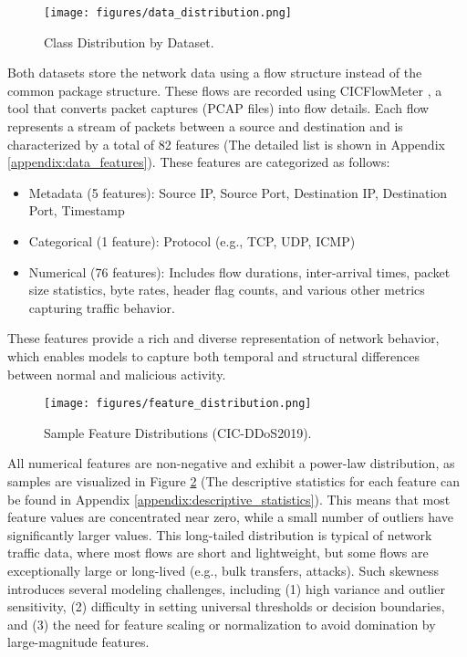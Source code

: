 \begin{figure}[h]
    \centering
    \texttt{[image: figures/data\_distribution.png]}
    \caption{Class Distribution by Dataset.}
    \label{fig:data_distribution}
\end{figure}

Both datasets store the network data using a flow structure instead of the common package structure. These flows are recorded using CICFlowMeter \citep{cicflowmeter}, a tool that converts packet captures (PCAP files) into flow details. Each flow represents a stream of packets between a source and destination and is characterized by a total of 82 features (The detailed list is shown in Appendix \ref{appendix:data_features}). These features are categorized as follows:

\begin{itemize}
    \item Metadata (5 features): Source IP, Source Port, Destination IP, Destination Port, Timestamp
    \item Categorical (1 feature): Protocol (e.g., TCP, UDP, ICMP)
    \item Numerical (76 features): Includes flow durations, inter-arrival times, packet size statistics, byte rates, header flag counts, and various other metrics capturing traffic behavior.
\end{itemize}

These features provide a rich and diverse representation of network behavior, which enables models to capture both temporal and structural differences between normal and malicious activity.

\begin{figure}[h]
    \centering
    \texttt{[image: figures/feature\_distribution.png]}
    \caption{Sample Feature Distributions (CIC-DDoS2019).}
    \label{fig:feature_distribution}
\end{figure}

All numerical features are non-negative and exhibit a power-law distribution, as samples are visualized in Figure \ref{fig:feature_distribution} (The descriptive statistics for each feature can be found in Appendix \ref{appendix:descriptive_statistics}). This means that most feature values are concentrated near zero, while a small number of outliers have significantly larger values. This long-tailed distribution is typical of network traffic data, where most flows are short and lightweight, but some flows are exceptionally large or long-lived (e.g., bulk transfers, attacks). Such skewness introduces several modeling challenges, including (1) high variance and outlier sensitivity, (2) difficulty in setting universal thresholds or decision boundaries, and (3) the need for feature scaling or normalization to avoid domination by large-magnitude features.

